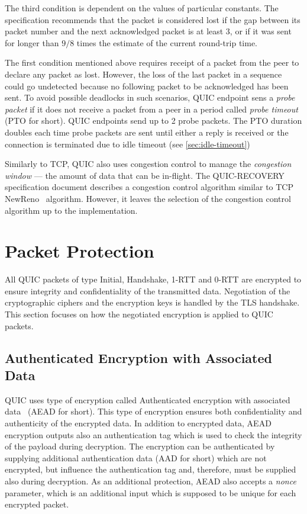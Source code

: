 The third condition is dependent on the values of particular constants. The specification recommends
that the packet is considered lost if the gap between its packet number and the next acknowledged
packet is at least 3, or if it was sent for longer than $9/8$ times the estimate of the current
round-trip time.

The first condition mentioned above requires receipt of a packet from the peer to declare any packet
as lost. However, the loss of the last packet in a sequence could go undetected because no following
packet to be acknowledged has been sent. To avoid possible deadlocks in such scenarios, QUIC
endpoint sens a \textit{probe packet} if it does not receive a packet from a peer in a period called
\textit{probe timeout} (PTO for short). QUIC endpoints send up to 2 probe packets. The PTO duration
doubles each time probe packets are sent until either a reply is received or the connection is
terminated due to idle timeout (see \autoref{sec:idle-timeout})

Similarly to TCP, QUIC also uses congestion control to manage the \textit{congestion window} --- the
amount of data that can be in-flight. The QUIC-RECOVERY specification document describes a
congestion control algorithm similar to TCP NewReno~\cite{rfc6582} algorithm. However, it leaves the
selection of the congestion control algorithm up to the implementation.

\section{Packet Protection}

All QUIC packets of type Initial, Handshake, 1-RTT and 0-RTT are encrypted to ensure integrity and
confidentiality of the transmitted data. Negotiation of the cryptographic ciphers and the encryption
keys is handled by the TLS handshake. This section focuses on how the negotiated encryption is
applied to QUIC packets.

\subsection{Authenticated Encryption with Associated Data}

QUIC uses type of encryption called Authenticated encryption with associated data~\cite{rfc5116}
(AEAD for short). This type of encryption ensures both confidentiality and authenticity of the
encrypted data. In addition to encrypted data, AEAD encryption outputs also an authentication tag
which is used to check the integrity of the payload during decryption. The encryption can be
authenticated by supplying additional authentication data (AAD for short) which are not encrypted,
but influence the authentication tag and, therefore, must be supplied also during decryption. As an
additional protection, AEAD also accepts a \textit{nonce} parameter, which is an additional input
which is supposed to be unique for each encrypted packet.

